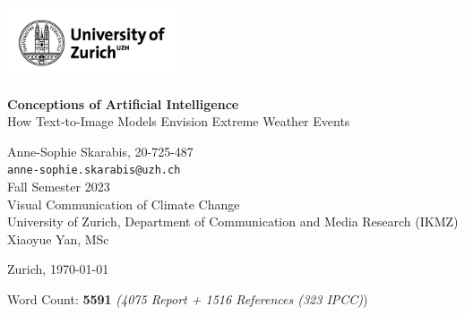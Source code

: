 \begin{titlepage}
\selectfont %

\noindent
\includegraphics[width=5cm]{resources/uzh_logo_e_pos_standard.jpg} %

\vspace*{2cm} %

\begin{center}

\vspace*{2.5cm}

\Huge
\textbf{Conceptions of Artificial Intelligence} \\ %
\Large
How Text-to-Image Models Envision Extreme Weather Events %

\vspace{1.5cm}

\Large
Anne-Sophie Skarabis, 20-725-487 \\
\normalsize
\texttt{anne-sophie.skarabis@uzh.ch} \\
\vspace{0.5cm}
\small
Fall Semester 2023 \\
Visual Communication of Climate Change \\
University of Zurich, Department of Communication and Media Research (IKMZ) \\
Xiaoyue Yan, MSc

\vspace{1cm}
\small
Zurich, \today %

\vfill

\small
Word Count: \textbf{5591} \textit{(4075 Report + 1516 References (323 IPCC)})


\end{center}
\end{titlepage}